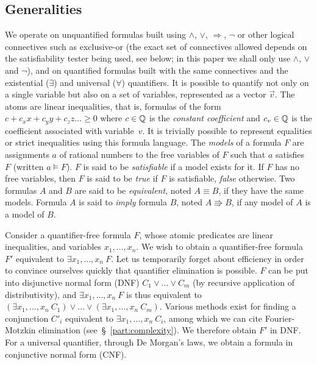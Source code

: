 \subsection{Generalities}
We operate on unquantified formulas built using $\wedge$, $\vee$, $\Rightarrow$, $\neg$ or other logical connectives such as exclusive-or (the exact set of connectives allowed depends on the satisfiability tester being used, see below; in this paper we shall only use $\wedge$, $\vee$ and $\neg$), and on quantified formulas built with the same connectives and the existential ($\exists$) and universal ($\forall$) quantifiers. It is possible to quantify not only on a single variable but also on a set of variables, represented as a vector $\vec{v}$. The atoms are linear inequalities, that is, formulas of the form $c + c_x x + c_y y + c_z z \dots \geq 0$ where $c \in \mathbb{Q}$ is the \emph{constant coefficient} and $c_v \in \mathbb{Q}$ is the coefficient associated with variable~$v$. It is trivially possible to represent equalities or strict inequalities using this formula language.
The \emph{models} of a formula $F$ are assignments $a$ of rational numbers to the free variables of $F$ such that $a$ satisfies $F$ (written $a \models F$). $F$ is said to be \emph{satisfiable} if a model exists for it. If $F$ has no free variables, then $F$ is said to be \emph{true} if $F$ is satisfiable, \emph{false} otherwise. Two formulas $A$ and $B$ are said to be \emph{equivalent}, noted $A \equiv B$, if they have the same models. Formula $A$ is said to \emph{imply} formula $B$, noted $A \Rrightarrow B$, if any model of $A$ is a model of $B$.

Consider a quantifier-free formula $F$, whose atomic predicates are linear inequalities, and variables $x_1,\dots,x_n$. We wish to obtain a quantifier-free formula $F'$ equivalent to $\exists x_1,\dots,x_n~F$. Let us temporarily forget about efficiency in order to convince ourselves quickly that quantifier elimination is possible. $F$ can be put into disjunctive normal form (DNF) $C_1 \vee \dots \vee C_m$ (by recursive application of distributivity), and $\exists x_1,\dots,x_n~F$ is thus equivalent to $(\exists x_1,\dots,x_n~C_1) \vee \dots \vee (\exists x_1,\dots,x_n~C_m)$. Various methods exist for finding a conjunction $C'_i$ equivalent to $\exists x_1,\dots,x_n~C_i$, among which we can cite Fourier-Motzkin elimination (see~\S~\ref{part:complexity}). We therefore obtain $F'$ in DNF. For a universal quantifier, through De Morgan's laws, we obtain a formula in conjunctive normal form (CNF).

